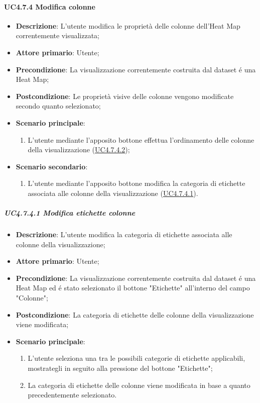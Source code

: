 \paragraph{UC4.7.4 Modifica colonne}
\label{par:uc4.7.4}
\begin{itemize}
    \item \textbf{Descrizione}:     L'utente modifica le proprietà delle colonne dell'Heat Map correntemente visualizzata;
    \item \textbf{Attore primario}: Utente;
    \item \textbf{Precondizione}:   La visualizzazione correntemente costruita dal dataset é una Heat Map;
    \item \textbf{Postcondizione}:  Le proprietà visive delle colonne vengono modificate secondo quanto selezionato;
    
    \item \textbf{Scenario principale}:
    \begin{enumerate}
        \item L'utente mediante l'apposito bottone effettua l'ordinamento delle colonne della visualizzazione (\hyperref[spar:uc4.7.4.2]{UC4.7.4.2});
    \end{enumerate}
    \item \textbf{Scenario secondario}:
    \begin{enumerate}
        \item L'utente mediante l'apposito bottone modifica la categoria di etichette associata alle colonne della visualizzazione (\hyperref[spar:uc4.7.4.1]{UC4.7.4.1}).
    \end{enumerate}
\end{itemize}

\subparagraph{UC4.7.4.1 Modifica etichette colonne}
\label{spar:uc4.7.4.1}
\begin{itemize}
    \item \textbf{Descrizione}:     L'utente modifica la categoria di etichette associata alle colonne della visualizzazione;
    \item \textbf{Attore primario}: Utente;
    \item \textbf{Precondizione}:   La visualizzazione correntemente costruita dal dataset é una Heat Map ed é stato selezionato il bottone "Etichette" all'interno del campo "Colonne";
    \item \textbf{Postcondizione}:  La categoria di etichette delle colonne della visualizzazione viene modificata;
    \item \textbf{Scenario principale}:
    \begin{enumerate}
        \item L'utente seleziona una tra le possibili categorie di etichette applicabili, mostrategli in seguito alla pressione del bottone "Etichette";
        \item La categoria di etichette delle colonne viene modificata in base a quanto precedentemente selezionato.
    \end{enumerate}
\end{itemize}

